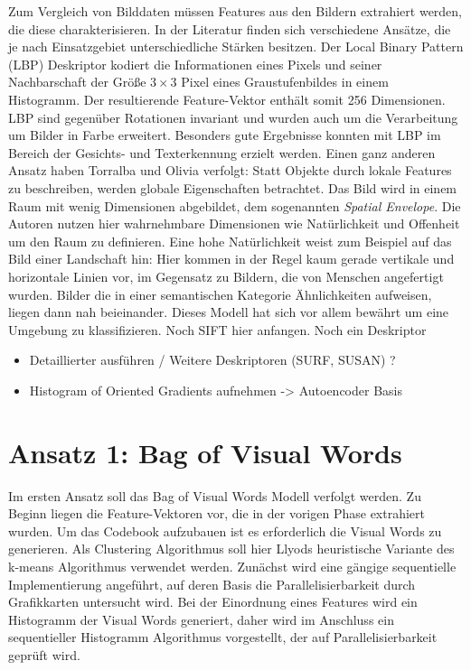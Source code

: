 Zum Vergleich von Bilddaten müssen Features aus den Bildern extrahiert werden, die diese charakterisieren. In der Literatur finden sich verschiedene Ansätze, die je nach Einsatzgebiet unterschiedliche Stärken besitzen. 
Der Local Binary Pattern (LBP) Deskriptor kodiert die Informationen eines Pixels und seiner Nachbarschaft der Größe $3 \times 3$ Pixel eines Graustufenbildes in einem Histogramm. Der resultierende Feature-Vektor enthält somit 256 Dimensionen. LBP sind gegenüber Rotationen invariant und wurden auch um die Verarbeitung um Bilder in Farbe erweitert. Besonders gute Ergebnisse konnten mit LBP im Bereich der Gesichts- und Texterkennung erzielt werden.
Einen ganz anderen Ansatz haben Torralba und Olivia verfolgt: Statt Objekte durch lokale Features zu beschreiben, werden globale Eigenschaften betrachtet. Das Bild wird in einem Raum mit wenig Dimensionen abgebildet, dem sogenannten \textit{Spatial Envelope}. Die Autoren nutzen hier wahrnehmbare Dimensionen wie Natürlichkeit und Offenheit um den Raum zu definieren. Eine hohe Natürlichkeit weist zum Beispiel auf das Bild einer Landschaft hin: Hier kommen in der Regel kaum gerade vertikale und horizontale Linien vor, im Gegensatz zu Bildern, die von Menschen angefertigt wurden.  Bilder die in einer semantischen Kategorie Ähnlichkeiten aufweisen, liegen dann nah beieinander. Dieses Modell hat sich vor allem bewährt um eine Umgebung zu klassifizieren. \cite{mts2001}
Noch SIFT hier anfangen. Noch ein Deskriptor 

\begin{itemize}
	\item Detaillierter ausführen / Weitere Deskriptoren (SURF, SUSAN) ?
	\item Histogram of Oriented Gradients aufnehmen -> Autoencoder Basis
\end{itemize}

\section{Ansatz 1: Bag of Visual Words}

Im ersten Ansatz soll das Bag of Visual Words Modell verfolgt werden. Zu Beginn liegen die Feature-Vektoren vor, die in der vorigen Phase extrahiert wurden. Um das Codebook aufzubauen ist es erforderlich die Visual Words zu generieren. Als Clustering Algorithmus soll hier Llyods heuristische Variante des k-means Algorithmus verwendet werden. Zunächst wird eine gängige sequentielle Implementierung angeführt, auf deren Basis die Parallelisierbarkeit durch Grafikkarten untersucht wird. Bei der Einordnung eines Features wird ein Histogramm der Visual Words generiert, daher wird im Anschluss ein sequentieller Histogramm Algorithmus vorgestellt, der auf Parallelisierbarkeit geprüft wird.

